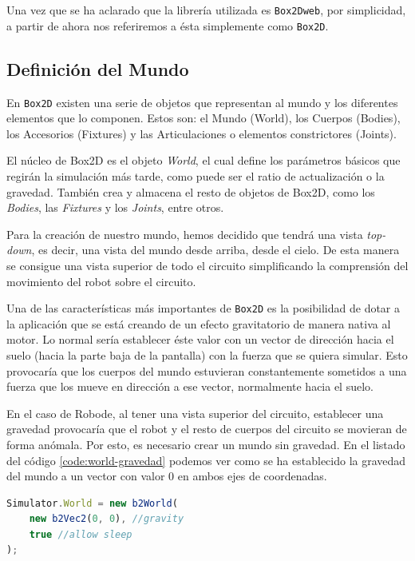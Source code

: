 Una vez que se ha aclarado que la librería utilizada es \texttt{Box2Dweb}, por simplicidad, a partir de ahora nos referiremos a ésta simplemente como \texttt{Box2D}.

\subsection{Definición del Mundo}

En \texttt{Box2D} existen una serie de objetos que representan al mundo y los diferentes elementos que lo componen.  Estos son: el Mundo (World), los Cuerpos (Bodies), los Accesorios (Fixtures) y las Articulaciones o elementos constrictores (Joints).

El núcleo de Box2D es el objeto \emph{World}, el cual define los parámetros básicos que regirán la simulación más tarde, como puede ser el ratio de actualización o la gravedad. También crea y almacena el resto de objetos de Box2D, como los \emph{Bodies}, las \emph{Fixtures} y los \emph{Joints}, entre otros.

Para la creación de nuestro mundo, hemos decidido que tendrá una vista \emph{top-down}, es decir, una vista del mundo desde arriba, desde el cielo. De esta manera se consigue una vista superior de todo el circuito simplificando la comprensión del movimiento del robot sobre el circuito.

Una de las características más importantes de \texttt{Box2D} es la posibilidad de dotar a la aplicación que se está creando de un efecto gravitatorio de manera nativa al motor. Lo normal sería establecer éste valor con un vector de dirección hacia el suelo (hacia la parte baja de la pantalla) con la fuerza que se quiera simular. Esto provocaría que los cuerpos del mundo estuvieran constantemente sometidos a una fuerza que los mueve en dirección a ese vector, normalmente hacia el suelo.  

En el caso de Robode, al tener una vista superior del circuito, establecer una gravedad provocaría que el robot y el resto de cuerpos del circuito se movieran de forma anómala. Por esto, es necesario crear un mundo sin gravedad. En el listado del código \ref{code:world-gravedad} podemos ver como se ha establecido la gravedad del mundo a un vector con valor 0 en ambos ejes de coordenadas. 

\begin{lstlisting}[language={Javascript},label={code:world-gravedad}, caption={Definición del objeto \texttt{World} en Box2D con gravedad 0 y permitiendo que los cuerpos sean capaces de dormir.}]
Simulator.World = new b2World(
	new b2Vec2(0, 0), //gravity
	true //allow sleep
);
\end{lstlisting}

